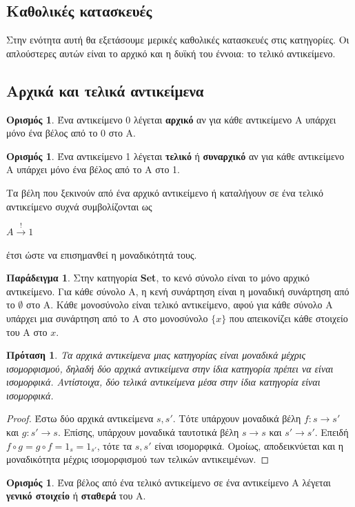 \documentclass [a4paper,11pt] {book}
\newtheorem{proposition}[theorem]{Πρόταση}
\theoremstyle{definition}
\newtheorem{example}[theorem]{Παράδειγμα}
\theoremstyle{definition}
\newtheorem{definition}[theorem]{Ορισμός}
\begin{document}
\subsection*{Καθολικές κατασκευές}
Στην ενότητα αυτή θα εξετάσουμε μερικές καθολικές κατασκευές στις κατηγορίες. Οι απλούστερες αυτών είναι το αρχικό και η δυϊκή του έννοια: το τελικό αντικείμενο.
\subsection{Αρχικά και τελικά αντικείμενα}
\begin{definition}\label{initial}
Ένα αντικείμενο 0 λέγεται \textbf{αρχικό} αν για κάθε αντικείμενο Α υπάρχει μόνο ένα βέλος από το 0 στο Α.
\end{definition}
\begin{definition}\label{final}
Ένα αντικείμενο 1 λέγεται \textbf{τελικό} ή \textbf{συναρχικό} αν για κάθε αντικείμενο Α υπάρχει μόνο ένα βέλος από το Α στο 1.
\end{definition}
Τα βέλη που ξεκινούν από ένα αρχικό αντικείμενο ή καταλήγουν σε ένα τελικό αντικείμενο συχνά συμβολίζονται ως
\begin{center}
$A \xrightarrow{!} 1 $
\end{center}
έτσι ώστε να επισημανθεί η μοναδικότητά τους.
\begin{example}\label{objectsInSet}
Στην κατηγορία \textbf{Set}, το κενό σύνολο είναι το μόνο αρχικό αντικείμενο. Για κάθε σύνολο Α, η κενή συνάρτηση είναι η μοναδική συνάρτηση από το $\emptyset$ στο Α. Κάθε μονοσύνολο είναι τελικό αντικείμενο, αφού για κάθε σύνολο Α υπάρχει μια συνάρτηση από το Α στο μονοσύνολο $\{x\}$ που απεικονίζει κάθε στοιχείο του Α στο $x$.
\end{example}
\begin{proposition}\label{uniquenessOfObjects}
Τα αρχικά αντικείμενα μιας κατηγορίας είναι μοναδικά μέχρις ισομορφισμού, δηλαδή δύο αρχικά αντικείμενα στην ίδια κατηγορία πρέπει να είναι ισομορφικά. Αντίστοιχα, δύο τελικά αντικείμενα μέσα στην ίδια κατηγορία είναι ισομορφικά.
\end{proposition}
\begin{proof}
Έστω δύο αρχικά αντικείμενα $s,s'$. Τότε υπάρχουν μοναδικά βέλη $f:s \to s'$ και $g:s' \to s$. Επίσης, υπάρχουν μοναδικά ταυτοτικά βέλη $s\to s$ και $s'\to s'$. Επειδή $f\circ g=g\circ f=1_{s}=1_{s'}$, τότε τα $s,s'$ είναι ισομορφικά. Ομοίως, αποδεικνύεται και η μοναδικότητα μέχρις ισομορφισμού των τελικών αντικειμένων.
\end{proof}
\begin{definition}\label{globalElement}
Ένα βέλος από ένα τελικό αντικείμενο σε ένα αντικείμενο Α λέγεται \textbf{γενικό στοιχείο} ή \textbf{σταθερά} του Α.
\end{definition}
\end{document}
